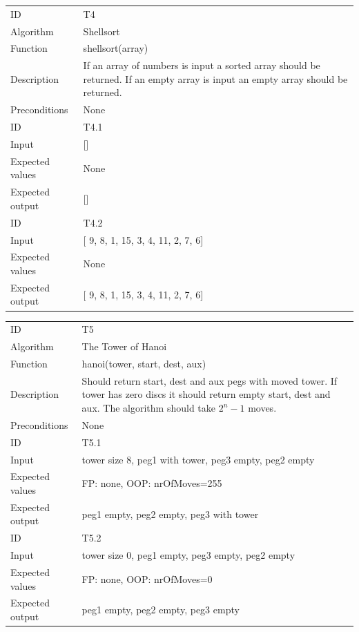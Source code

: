 \documentclass {article}
\begin{document}
\begin{tabular}{ | l p{10cm} | }
\hline
ID & T4 \\
Algorithm & Shellsort \\
Function & shellsort(array) \\
Description & If an array of numbers is input a sorted array should be returned. If an empty array is input an empty array should be returned. \\
Preconditions & None \\
\hline
ID & T4.1 \\
Input & [] \\
Expected values & None \\
Expected output &  [] \\
\hline
ID & T4.2 \\
Input & [ 9, 8, 1, 15, 3, 4, 11, 2, 7, 6] \\
Expected values & None \\
Expected output & [ 9, 8, 1, 15, 3, 4, 11, 2, 7, 6] \\
\hline
\end{tabular}

\begin{tabular}{ | l p{10cm} | }
\hline
ID & T5 \\
Algorithm & The Tower of Hanoi \\
Function &  hanoi(tower, start, dest, aux) \\
Description & Should return start, dest and aux pegs with moved tower. If tower has zero discs it should return empty start, dest and aux. The algorithm should take \(2^n - 1\) moves.\\
Preconditions & None \\
\hline
ID & T5.1 \\
Input & tower size 8, peg1 with tower, peg3 empty, peg2 empty \\
Expected values & FP: none, OOP: nrOfMoves=255 \\
Expected output &  peg1 empty, peg2 empty, peg3 with tower \\
\hline
ID & T5.2 \\
Input & tower size 0, peg1 empty, peg3 empty, peg2 empty \\
Expected values & FP: none, OOP: nrOfMoves=0 \\
Expected output & peg1 empty, peg2 empty, peg3 empty \\
\hline
\end{tabular}
\end{document}
